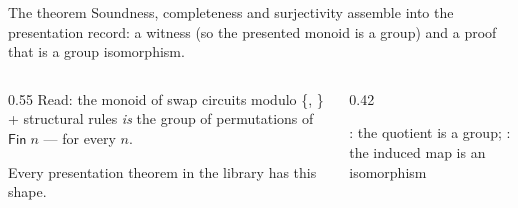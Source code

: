 \begin{frame}{The theorem \InPaper}
Soundness, completeness and surjectivity assemble into the
\alert{presentation record}: a  witness (so the presented
monoid is a group) and a proof that  is a group isomorphism.
\vspace{4pt}
\begin{code}%
\>[0]\AgdaSpace{}%
\AgdaSymbol{:}\AgdaSpace{}%
\AgdaSpace{}%
\AgdaSpace{}%
\AgdaSpace{}%
\AgdaSymbol{(}\AgdaSpace{}%
\AgdaSymbol{)}\AgdaSpace{}%
\AgdaSpace{}%
\AgdaSymbol{(}\AgdaSpace{}%
\AgdaSymbol{)}\<%
\end{code}
\begin{code}[hide]%
\>[0]\AgdaSpace{}%
\AgdaSpace{}%
\AgdaSymbol{=}\AgdaSpace{}%
\AgdaSpace{}%
\<%
\end{code}
\vspace{2pt}
\begin{columns}[c]
\begin{column}{0.55\textwidth}
\small Read: the monoid of swap circuits modulo \{,
\} + structural rules \emph{is} the group of permutations of
$\mathsf{Fin}\;n$ --- for every $n$.

\vspace{4pt}
Every presentation theorem in the library has this shape.
\end{column}
\begin{column}{0.42\textwidth}
\centering
{}

\vspace{4pt}
{\scriptsize {}: the quotient is a group; : the induced map is an isomorphism}
\end{column}
\end{columns}
\end{frame}
